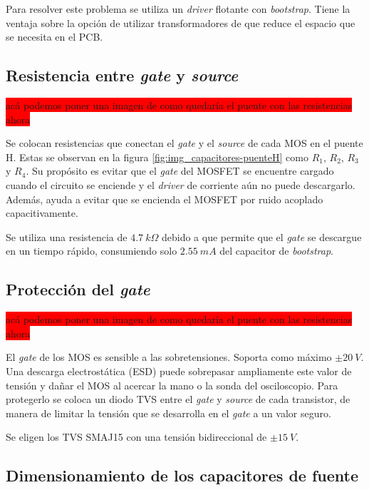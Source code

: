 Para resolver este problema se utiliza un \textsl{driver} flotante con \textsl{bootstrap}. Tiene la ventaja sobre la opción de utilizar transformadores de que reduce el espacio que se necesita en el PCB.


\subsection{Resistencia entre \textsl{gate} y \textsl{source}} \label{secc_res_gate_source}

\colorbox{red}{acá podemos poner una imagen de como quedaría el puente con las resistencias ahora}

\noindent Se colocan resistencias que conectan el \textsl{gate} y el \textsl{source} de cada MOS en el puente H. Estas se observan en la figura \ref{fig:img_capacitores-puenteH} como $R_1$, $R_2$, $R_3$ y $R_4$. Su propósito es evitar que el \textsl{gate} del MOSFET se encuentre cargado cuando el circuito se enciende y el \textsl{driver} de corriente aún no puede descargarlo. Además, ayuda a evitar que se encienda el MOSFET por ruido acoplado capacitivamente. 

\noindent Se utiliza una resistencia de $4.7 \:k\Omega$ debido a que permite que el \textsl{gate} se descargue en un tiempo rápido, consumiendo solo $2.55\:mA$ del capacitor de \textsl{bootstrap}.

\subsection{Protección del \textsl{gate}}

\colorbox{red}{acá podemos poner una imagen de como quedaría el puente con las resistencias ahora}

\noindent El \textsl{gate} de los MOS es sensible a las sobretensiones. Soporta como máximo $\pm 20\:V$. Una descarga electrostática (ESD) puede sobrepasar ampliamente este valor de tensión y dañar el MOS al acercar la mano o la sonda del osciloscopio. Para protegerlo se coloca un diodo TVS entre el \textsl{gate} y \textsl{source} de cada transistor, de manera de limitar la tensión que se desarrolla en el \textsl{gate} a un valor seguro.

\noindent Se eligen los TVS SMAJ15 con una tensión bidireccional de $\pm 15\:V$.

\subsection{Dimensionamiento de los capacitores de fuente}

